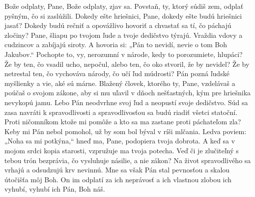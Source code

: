 Bože odplaty, Pane,
Bože odplaty, zjav sa.
\versseparator
Povstaň, ty, ktorý súdiš zem,
odplať pyšným, čo si zaslúžili.
\versseparator
Dokedy ešte hriešnici, Pane,
dokedy ešte budú hriešnici jasať?
\versseparator
Dokedy budú rečniť a opovážlivo hovoriť
a chvastať sa tí, čo páchajú zločiny?
\versseparator
Pane, šliapu po tvojom ľude
a tvoje dedičstvo týrajú.
\versseparator
Vraždia vdovy a cudzincov
a zabíjajú siroty.
\versseparator
A hovoria si: „Pán to nevidí,
nevie o tom Boh Jakubov.“
\versseparator
Pochopte to, vy, nerozumní v národe,
kedy to porozumiete, hlupáci?
\versseparator
Že by ten, čo vsadil ucho, nepočul,
alebo ten, čo oko stvoril, že by nevidel?
\versseparator
Že by netrestal ten, čo vychováva národy,
čo učí ľud múdrosti?
\versseparator
Pán pozná ľudské myšlienky
a vie, aké sú márne.
\versseparator
Blažený človek, ktorého ty, Pane, vzdelávaš
a poúčaš o svojom zákone,
\versseparator
aby si mu uľavil v dňoch nešťastných,
kým pre hriešnika nevykopú jamu.
\versseparator
Lebo Pán neodvrhne svoj ľud
a neopustí svoje dedičstvo.
\versseparator
Súd sa zasa navráti k spravodlivosti
a spravodlivosťou sa budú riadiť všetci statoční.
\versseparator
Proti ničomníkom ktože mi pomôže
a kto sa ma zastane proti páchateľom zla?
\versseparator
Keby mi Pán nebol pomohol,
už by som bol býval v ríši mlčania.
\versseparator
Ledva poviem: „Noha sa mi potkýna,“
hneď ma, Pane, podopiera tvoja dobrota.
\versseparator
A keď sa v mojom srdci kopia starosti,
vzpružuje ma tvoja potecha.
\versseparator
Veď či je zlučiteľný s tebou trón bezprávia,
čo vysluhuje násilie, a nie zákon?
\versseparator
Na život spravodlivého sa vrhajú
a odsudzujú krv nevinnú.
\versseparator
Mne sa však Pán stal pevnosťou
a skalou útočišťa môj Boh.
\versseparator
On im odplatí za ich neprávosť
a ich vlastnou zlobou ich vyhubí,
vyhubí ich Pán, Boh náš. 